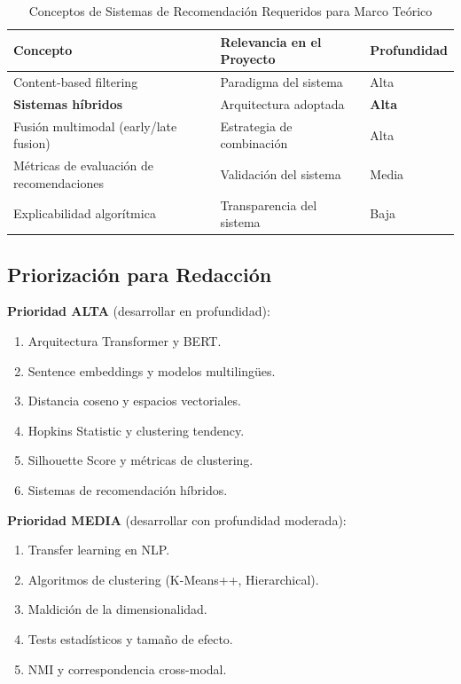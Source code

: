 \begin{table}[htbp]
\centering
\caption{Conceptos de Sistemas de Recomendación Requeridos para Marco Teórico}
\label{tab:conceptos-recsys}
\begin{tabular}{lll}
\toprule
\textbf{Concepto} & \textbf{Relevancia en el Proyecto} & \textbf{Profundidad} \\
\midrule
Content-based filtering & Paradigma del sistema & Alta \\
\textbf{Sistemas híbridos} & Arquitectura adoptada & \textbf{Alta} \\
Fusión multimodal (early/late fusion) & Estrategia de combinación & Alta \\
Métricas de evaluación de recomendaciones & Validación del sistema & Media \\
Explicabilidad algorítmica & Transparencia del sistema & Baja \\
\bottomrule
\end{tabular}
\end{table}

\subsection{Priorización para Redacción}

\textbf{Prioridad ALTA} (desarrollar en profundidad):
\begin{enumerate}
    \item Arquitectura Transformer y BERT.
    \item Sentence embeddings y modelos multilingües.
    \item Distancia coseno y espacios vectoriales.
    \item Hopkins Statistic y clustering tendency.
    \item Silhouette Score y métricas de clustering.
    \item Sistemas de recomendación híbridos.
\end{enumerate}

\textbf{Prioridad MEDIA} (desarrollar con profundidad moderada):
\begin{enumerate}
    \item Transfer learning en NLP.
    \item Algoritmos de clustering (K-Means++, Hierarchical).
    \item Maldición de la dimensionalidad.
    \item Tests estadísticos y tamaño de efecto.
    \item NMI y correspondencia cross-modal.
\end{enumerate}

